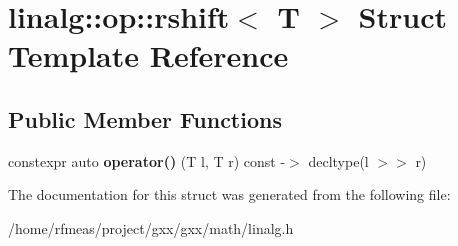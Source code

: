 \hypertarget{structlinalg_1_1op_1_1rshift}{}\section{linalg\+:\+:op\+:\+:rshift$<$ T $>$ Struct Template Reference}
\label{structlinalg_1_1op_1_1rshift}
\subsection*{Public Member Functions}
\begin{DoxyCompactItemize}
\item 
constexpr auto {\bfseries operator()} (T l, T r) const -\/$>$ decltype(l $>$$>$ r)\hypertarget{structlinalg_1_1op_1_1rshift_a9e5fdaba70e55ebc63639d3341ab9e32}{}\label{structlinalg_1_1op_1_1rshift_a9e5fdaba70e55ebc63639d3341ab9e32}

\end{DoxyCompactItemize}


The documentation for this struct was generated from the following file\+:\begin{DoxyCompactItemize}
\item 
/home/rfmeas/project/gxx/gxx/math/linalg.\+h\end{DoxyCompactItemize}
